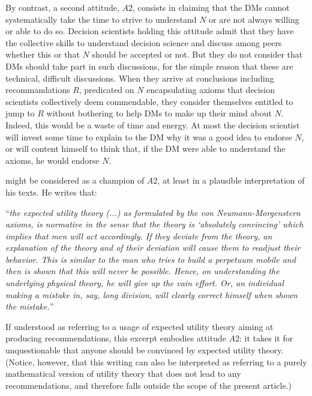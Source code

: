 \documentclass[preprint, french, english, 11pt, authoryear]{elsarticle}%
\begin{document}
By contrast, a second attitude, $A2$, consists in claiming that the \acp{DM} cannot systematically take the time to strive to understand $N$ or are not always willing or able to do so. Decision scientists holding this attitude admit that they have the collective skills to understand decision science and discuss among peers whether this or that $N$ should be accepted or not. But they do not consider that \acp{DM} should take part in such discussions, for the simple reason that these are technical, difficult discussions. When they arrive at conclusions including recommandations $R$, predicated on $N$ encapsulating axioms that decision scientists collectively deem commendable, they consider themselves entitled to jump to $R$ without bothering to help \acp{DM} to make up their mind about $N$. Indeed, this would be a waste of time and energy. At most the decision scientist will invest some time to explain to the \ac{DM} why it was a good idea to endorse $N$, or will content himself to think that, if the \ac{DM} were able to understand the axioms, he would endorse $N$.

\citet[p. 180]{morgenstern_reflections_1979} might be considered as a champion of $A2$, at least in a plausible interpretation of his texts. He writes that: 

\begin{addmargin}[3em]{3em}
“\emph{the expected utility theory (...) as formulated by the von Neumann-Morgenstern axioms, is normative in the sense that the theory is ‘absolutely convincing’ which implies that men will act accordingly. If they deviate from the theory, an explanation of the theory and of their deviation will cause them to readjust their behavior. This is similar to the man who tries to build a perpetuum mobile and then is shown that this will never be possible. Hence, on understanding the underlying physical theory, he will give up the vain effort. Or, an individual making a mistake in, say, long division, will clearly correct himself when shown the mistake.}” 
\end{addmargin}
If understood as referring to a usage of expected utility theory aiming at producing recommendations, this excerpt embodies attitude $A2$: it takes it for unquestionable that anyone should be convinced by expected utility theory. (Notice, however, that this writing can also be interpreted as referring to a purely mathematical version of utility theory that does not lead to any recommendations, and therefore falls outside the scope of the present article.)
\end{document}
